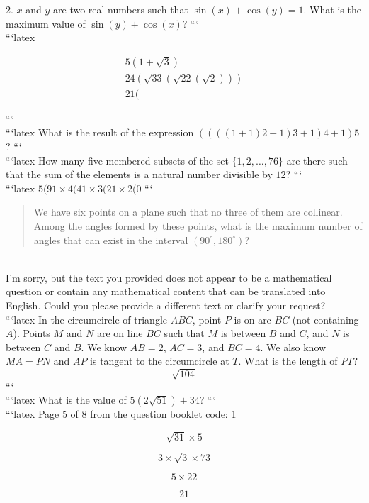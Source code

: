 2. $x$ and $y$ are two real numbers such that $\sin(x) + \cos(y) = 1$. What is the maximum value of $\sin(y) + \cos(x)$?
```
\\
```latex
\begin{question}
\begin{align*}
5(1 + \sqrt{3}) \\
24(\sqrt{33}(\sqrt{22}(\sqrt{2}))) \\
21(
\end{align*}
\end{question}
```
\\
```latex
What is the result of the expression $((((1+1)2+1)3+1)4+1)5$?
```
\\
```latex
How many five-membered subsets of the set $\{1, 2, \ldots, 76\}$ are there such that the sum of the elements is a natural number divisible by $12$?
```
\\
```latex
$5(91 \times 4(41 \times 3(21 \times 2(0$
```
\\
\begin{quote}
We have six points on a plane such that no three of them are collinear. Among the angles formed by these points, what is the maximum number of angles that can exist in the interval $(90^\circ, 180^\circ)$?
\end{quote}
\\
I'm sorry, but the text you provided does not appear to be a mathematical question or contain any mathematical content that can be translated into English. Could you please provide a different text or clarify your request?
\\
```latex
In the circumcircle of triangle $ABC$, point $P$ is on arc $BC$ (not containing $A$). Points $M$ and $N$ are on line $BC$ such that $M$ is between $B$ and $C$, and $N$ is between $C$ and $B$. We know $AB = 2$, $AC = 3$, and $BC = 4$. We also know $MA = PN$ and $AP$ is tangent to the circumcircle at $T$. What is the length of $PT$? 
\[
\sqrt{104}
\]
```
\\
```latex
What is the value of $5(2\sqrt{51}) + 34$?
```
\\
```latex
Page 5 of 8 from the question booklet code: 1

\[
\sqrt{31} \times 5
\]

\[
3 \times \sqrt{3} \times 73
\]

\[
5 \times 22
\]

\[
21
\]

